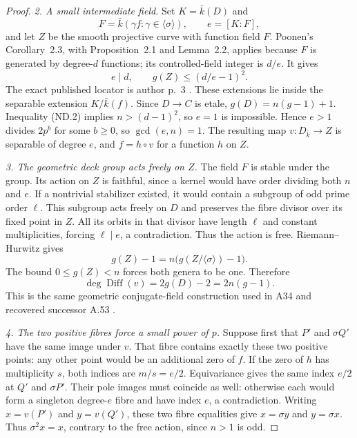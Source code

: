 \documentclass[11pt,a4paper]{article}
\begin{document}
\begin{proof}
\emph{2. A small intermediate field.}
Set $K=\bar k(D)$ and
\[
 F=\bar k(\gamma f:\gamma\in\langle\sigma\rangle),
 \qquad e=[K:F],
\]
and let $Z$ be the smooth projective curve with function field
$F$. Poonen's Corollary~2.3, with Proposition~2.1 and Lemma~2.2,
applies because $F$ is generated by degree-$d$ functions; its
controlled-field integer is $d/e$. It gives
\[
                    e\mid d,\qquad g(Z)\le(d/e-1)^2.
 \tag{ND.8}
\]
The exact published locator is author p.~3
\cite{Poonen2007Gonality}. These extensions lie inside the
separable extension $K/\bar k(f)$. Since $D\to C$ is etale,
$g(D)=n(g-1)+1$. Inequality (ND.2) implies $n>(d-1)^2$, so $e=1$
is impossible. Hence $e>1$ divides $2p^b$ for some $b\ge0$, so
$\gcd(e,n)=1$. The resulting
map $v:D_{\bar k}\to Z$ is separable of degree $e$, and
$f=h\circ v$ for a function $h$ on $Z$.

\emph{3. The geometric deck group acts freely on $Z$.}
The field $F$ is stable under the group. Its action on $Z$ is
faithful, since a kernel would have order dividing both $n$ and
$e$. If a nontrivial stabilizer existed, it would contain a
subgroup of odd prime order $\ell$. This subgroup acts freely
on $D$ and preserves the fibre divisor over its fixed point
in $Z$. All its orbits in that divisor have length $\ell$ and
constant multiplicities, forcing $\ell\mid e$, a contradiction.
Thus the action is free. Riemann--Hurwitz gives
\[
                    g(Z)-1=n\bigl(g(Z/\langle\sigma\rangle)-1\bigr).
\]
The bound $0\le g(Z)<n$ forces both genera to be one. Therefore
\[
                   \deg\operatorname{Diff}(v)=2g(D)-2=2n(g-1).
 \tag{ND.9}
\]
This is the same geometric conjugate-field construction used in
A34 and recovered successor A.53 \cite[A.53]{ASrun}.

\emph{4. The two positive fibres force a small power of $p$.}
Suppose first that $P'$ and $\sigma Q'$ have the same image
under $v$. That fibre contains exactly these two positive
points: any other point would be an additional zero of $f$.
If the zero of $h$ has multiplicity $s$, both indices are
$m/s=e/2$. Equivariance gives the same index $e/2$ at $Q'$
and $\sigma P'$. Their pole images must coincide as well:
otherwise each would form a singleton degree-$e$ fibre and
have index $e$, a contradiction. Writing $x=v(P')$ and
$y=v(Q')$, these two fibre equalities give
$x=\sigma y$ and $y=\sigma x$. Thus $\sigma^2x=x$, contrary
to the free action, since $n>1$ is odd.


\end{proof}
\end{document}
